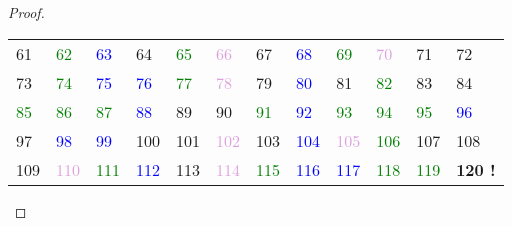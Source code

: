 \begin{proof}
\begin{center}
\begin{tabular}{llllllllllll}
\textcolor{BrickRed}{61} &\textcolor{green}{62} &\textcolor{blue}{63} &\textcolor{BrickRed}{64} &\textcolor{green}{65} &\textcolor{Plum}{66} &\textcolor{BrickRed}{67} &\textcolor{blue}{68} &\textcolor{green}{69} &\textcolor{Plum}{70} &\textcolor{BrickRed}{71} &72 \\
\textcolor{BrickRed}{73} &\textcolor{green}{74} &\textcolor{blue}{75} &\textcolor{blue}{76} &\textcolor{green}{77} &\textcolor{Plum}{78} &\textcolor{BrickRed}{79} &\textcolor{blue}{80} &\textcolor{BrickRed}{81} &\textcolor{green}{82} &\textcolor{BrickRed}{83} &84 \\
\textcolor{green}{85} &\textcolor{green}{86} &\textcolor{green}{87} &\textcolor{blue}{88} &\textcolor{BrickRed}{89} &90 &\textcolor{green}{91} &\textcolor{blue}{92} &\textcolor{green}{93} &\textcolor{green}{94} &\textcolor{green}{95} &\textcolor{blue}{96} \\
\textcolor{BrickRed}{97} &\textcolor{blue}{98} &\textcolor{blue}{99} &100 &\textcolor{BrickRed}{101} &\textcolor{Plum}{102} &\textcolor{BrickRed}{103} &\textcolor{blue}{104} &\textcolor{Plum}{105} &\textcolor{green}{106} &\textcolor{BrickRed}{107} &108 \\
\textcolor{BrickRed}{109} &\textcolor{Plum}{110} &\textcolor{green}{111} &\textcolor{blue}{112} &\textcolor{BrickRed}{113} &\textcolor{Plum}{114} &\textcolor{green}{115} &\textcolor{blue}{116} &\textcolor{blue}{117} &\textcolor{green}{118} &\textcolor{green}{119} &\textbf{120 !} \\
\end{tabular}
\end{center}


\end{proof}
